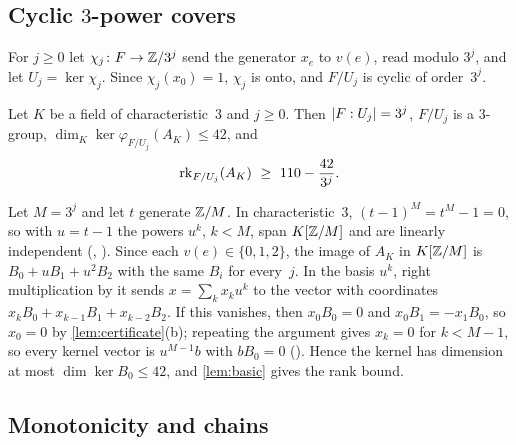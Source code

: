 \subsection{Cyclic \texorpdfstring{$3$}{3}-power covers}\label{sec:cyclic}

For $j\ge0$ let $\chi_j\colon F\to\mathbb{Z}/3^j$ send the generator $x_e$ to $v(e)$, read modulo $3^j$, and let
$U_j=\ker\chi_j$. Since $\chi_j(x_0)=1$, $\chi_j$ is onto, and $F/U_j$ is cyclic of order~$3^j$.

\begin{lemma}\label{lem:cyclic}
Let $K$ be a field of characteristic~$3$ and $j\ge0$. Then $\lvert F:U_j \rvert=3^j$, $F/U_j$ is a $3$-group,
$\dim_K\ker\varphi_{F/U_j}(A_K)\le42$, and
\[
  \rk_{F/U_j}(A_K)\ \ge\ 110-\frac{42}{3^j}.
\]
\end{lemma}
\begin{outline}
Let $M=3^j$ and let $t$ generate $\mathbb{Z}/M$. In characteristic~$3$, $(t-1)^M=t^M-1=0$, so with $u=t-1$ the powers $u^k$,
$k<M$, span $K[\mathbb{Z}/M]$ and are linearly independent (,
). Since each $v(e)\in\{0,1,2\}$, the image of $A_K$ in $K[\mathbb{Z}/M]$ is $B_0+uB_1+u^2B_2$ with the same $B_i$ for every~$j$. In the basis $u^k$, right multiplication by
it sends $x=\sum_kx_ku^k$ to the vector with coordinates $x_kB_0+x_{k-1}B_1+x_{k-2}B_2$. If this vanishes, then
$x_0B_0=0$ and $x_0B_1=-x_1B_0$, so $x_0=0$ by \cref{lem:certificate}(b); repeating the argument gives $x_k=0$ for
$k<M-1$, so every kernel vector is $u^{M-1}b$ with $bB_0=0$ (). Hence the
kernel has dimension at most $\dim\ker B_0\le42$, and \cref{lem:basic} gives the rank bound.
\end{outline}

\subsection{Monotonicity and chains}\label{sec:monotone}

